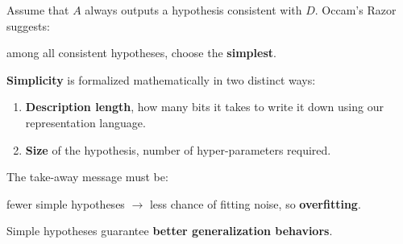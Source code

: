 Assume that $A$ always outputs a hypothesis consistent with $D$. Occam's Razor suggests:
\begin{center}
    among all consistent hypotheses, choose the \textbf{simplest}.
\end{center}
\textbf{Simplicity} is formalized mathematically in two distinct ways:
\begin{enumerate}
    \item \textbf{Description length}, how many bits it takes to write it down using our representation language.
    \item \textbf{Size} of the hypothesis, number of hyper-parameters required.
\end{enumerate} 
The take-away message must be:
\begin{center}
    fewer simple hypotheses $\rightarrow$ less chance of fitting noise, so \textbf{overfitting}.
\end{center}
Simple hypotheses guarantee \textbf{better generalization behaviors}.